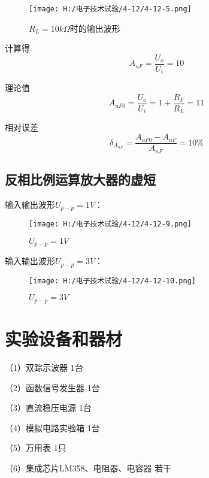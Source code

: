 \documentclass{article}
\begin{document}
	\begin{figure}[h]
		\centering
		\texttt{[image: H:/电子技术试验/4-12/4-12-5.png]}
		\caption{$R_L=10k\Omega$时的输出波形} \label{fig:aa}
	\end{figure}
	计算得
	\begin{equation*}
		\ A_{uF}=\frac{U_o}{U_i}=10
	\end{equation*}\par
	理论值
	\begin{equation*}
		\ A_{uF0}=\frac{U_o}{U_i}=1+\frac{R_F}{R_L}=11
	\end{equation*}\par
	相对误差
	\begin{equation*}
		\ \delta_{A_{uF}}=\frac{A_{uF0}-A_{uF}}{A_{uF}}=10\%
	\end{equation*}
		\newpage
	\par
	\subsection {反相比例运算放大器的虚短}
	输入输出波形$U_{p-p}=1V$：
	\begin{figure}[h]
		\centering
		\texttt{[image: H:/电子技术试验/4-12/4-12-9.png]}
		\caption{$U_{p-p}=1V$} \label{fig:aa}
	\end{figure}
\par
	输入输出波形$U_{p-p}=3V$：
	\begin{figure}[h]
		\centering
		\texttt{[image: H:/电子技术试验/4-12/4-12-10.png]}
		\caption{$U_{p-p}=3V$} \label{fig:aa}
	\end{figure}

	\section{ 实验设备和器材}
	（1）双踪示波器             \qquad \qquad \qquad \qquad \qquad  \qquad           1台\par
	（2）函数信号发生器          \qquad  \qquad \qquad \qquad       \qquad           1台\par
	（3）直流稳压电源             \qquad \quad \qquad \qquad \qquad \qquad           1台\par
	（4）模拟电路实验箱            \qquad  \qquad \qquad \qquad\qquad                1台\par
	（5）万用表                   \qquad  \qquad \qquad \qquad \qquad \qquad \qquad  1只\par
	（6）集成芯片LM358、电阻器、电容器  \quad                                        若干
\end{document}
